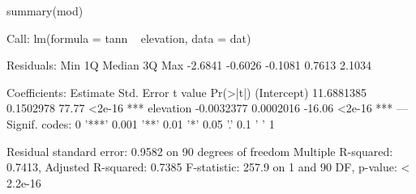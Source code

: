 \begin{Schunk}
\begin{Sinput}
 summary(mod)
\end{Sinput}
\begin{Soutput}
Call:
lm(formula = tann ~ elevation, data = dat)

Residuals:
    Min      1Q  Median      3Q     Max 
-2.6841 -0.6026 -0.1081  0.7613  2.1034 

Coefficients:
              Estimate Std. Error t value Pr(>|t|)    
(Intercept) 11.6881385  0.1502978   77.77   <2e-16 ***
elevation   -0.0032377  0.0002016  -16.06   <2e-16 ***
---
Signif. codes:  0 '***' 0.001 '**' 0.01 '*' 0.05 '.' 0.1 ' ' 1 

Residual standard error: 0.9582 on 90 degrees of freedom
Multiple R-squared: 0.7413,	Adjusted R-squared: 0.7385 
F-statistic: 257.9 on 1 and 90 DF,  p-value: < 2.2e-16 
\end{Soutput}
\end{Schunk}
